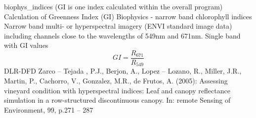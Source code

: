 %
{ %
biophys\_indices (GI is one index calculated within the overall program)
}
%
{ %
Calculation of Greenness Index (GI)
}
%
{ %
Biophysics - narrow band chlorophyll indices
}
%
{ %
Narrow band multi- or hyperspectral imagery (ENVI standard image data) including channels close to the wavelengths of 549nm and 671nm.\bigskip
}
%
{ %
Single band with GI values
}
%
{ %
\begin{displaymath}
GI = \frac{R_{671}}{R_{549}}
\end{displaymath}
}
%
{ %
DLR-DFD
}
%
{ %
Zarco – Tejada , P.J., Berjon, A., Lopez – Lozano, R., Miller, J.R., Martin, P., Cachorro, V., Gonzalez, M.R., de Frutos, A. (2005): Assessing vineyard condition with hyperspectral indices: Leaf and canopy reflectance simulation in a row-structured discontinuous canopy. In: remote Sensing of Environment, 99, p.271 – 287
}

